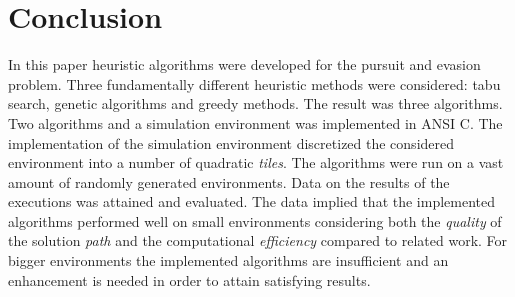 \chapter{Conclusion}
In this paper heuristic algorithms were developed for the pursuit and evasion problem. Three fundamentally different heuristic methods were considered: tabu search, genetic algorithms and greedy methods. The result was three algorithms. Two algorithms and a simulation environment was implemented in ANSI C. The implementation of the simulation environment discretized the considered environment into a number of quadratic \emph{tiles}. The algorithms were run on a vast amount of randomly generated environments. Data on the results of the executions was attained and evaluated. The data implied that the implemented algorithms performed well on small environments considering both the \emph{quality} of the solution \emph{path} and the computational \emph{efficiency} compared to related work. For bigger environments the implemented algorithms are insufficient and an enhancement is needed in order to attain satisfying results.